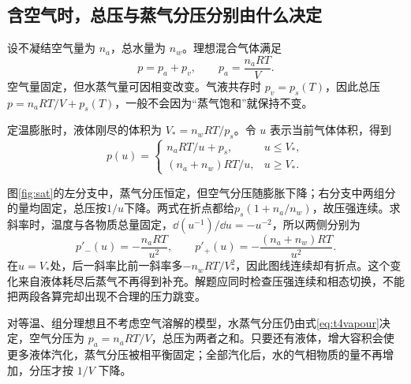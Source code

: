 
\subsection{含空气时，总压与蒸气分压分别由什么决定}
设不凝结空气量为 $n_a$，总水量为 $n_w$。理想混合气体满足
\[p=p_a+p_v,\qquad p_a=\frac{n_aRT}{V}.
\]
空气量固定，但水蒸气量可因相变改变。气液共存时 $p_v=p_s(T)$，因此总压 $p=n_aRT/V+p_s(T)$，一般不会因为“蒸气饱和”就保持不变。

定温膨胀时，液体刚尽的体积为 $V_*=n_wRT/p_s$。令 $u$ 表示当前气体体积，得到
\[\boxed{p(u)=\begin{cases}n_aRT/u+p_s,&u\le V_*,\\(n_a+n_w)RT/u,&u\ge V_* .\end{cases}}
\]

图\ref{fig:sat}的左分支中，蒸气分压恒定，但空气分压随膨胀下降；右分支中两组分的量均固定，总压按$1/u$下降。两式在折点都给$p_s(1+n_a/n_w)$，故压强连续。求斜率时，温度与各物质总量固定，$\dd(u^{-1})/\dd u=-u^{-2}$，所以两侧分别为
\[
p'_-(u)=-\frac{n_aRT}{u^2},\qquad
p'_+(u)=-\frac{(n_a+n_w)RT}{u^2}.
\]
在$u=V_*$处，后一斜率比前一斜率多$-n_wRT/V_*^2$，因此图线连续却有折点。这个变化来自液体耗尽后蒸气不再得到补充。解题应同时检查压强连续和相态切换，不能把两段各算完却出现不合理的压力跳变。

对等温、组分理想且不考虑空气溶解的模型，水蒸气分压仍由式\eqref{eq:t4vapour}决定，空气分压为 $p_a=n_aRT/V$，总压为两者之和。只要还有液体，增大容积会使更多液体汽化，蒸气分压被相平衡固定；全部汽化后，水的气相物质的量不再增加，分压才按 $1/V$ 下降。


